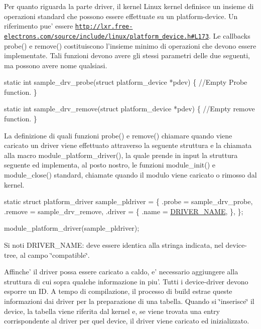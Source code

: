 Per quanto riguarda la parte driver, il kernel Linux kernel definisce un insieme di operazioni standard che possono essere effettuate su un platform-\/device. Un riferimento pue' essere \href{http://lxr.free-electrons.com/source/include/linux/platform_device.h#L173}{\tt http\+://lxr.\+free-\/electrons.\+com/source/include/linux/platform\+\_\+device.\+h\#\+L173}. Le callbacks probe() e remove() costituiscono l'insieme minimo di operazioni che devono essere implementate. Tali funzioni devono avere gli stessi parametri delle due seguenti, ma possono avere nome qualsiasi.


\begin{DoxyCode}
\textcolor{keyword}{static} \textcolor{keywordtype}{int} sample\_drv\_probe(\textcolor{keyword}{struct} platform\_device *pdev) \{
        \textcolor{comment}{//Empty Probe function.}
\}

\textcolor{keyword}{static} \textcolor{keywordtype}{int} sample\_drv\_remove(\textcolor{keyword}{struct} platform\_device *pdev) \{
        \textcolor{comment}{//Empty remove function.}
\}
\end{DoxyCode}


La definizione di quali funzioni probe() e remove() chiamare quando viene caricato un driver viene effettuato attraverso la seguente struttura e la chiamata alla macro module\+\_\+platform\+\_\+driver(), la quale prende in input la struttura seguente ed implementa, al posto nostro, le funzioni module\+\_\+init() e module\+\_\+close() standard, chiamate quando il modulo viene caricato o rimosso dal kernel.


\begin{DoxyCode}
\textcolor{keyword}{static} \textcolor{keyword}{struct }platform\_driver sample\_pldriver = \{
    .probe  = sample\_drv\_probe,
    .remove = sample\_drv\_remove,
    .driver = \{
        .name  = \hyperlink{group___linux-_driver_ga25634d21648ca7fb7a2aca614bafaaeb}{DRIVER\_NAME},
    \},
\};

module\_platform\_driver(sample\_pldriver);
\end{DoxyCode}


Si noti D\+R\+I\+V\+E\+R\+\_\+\+N\+A\+M\+E\+: deve essere identica alla stringa indicata, nel device-\/tree, al campo \char`\"{}compatible\char`\"{}.

Affinche' il driver possa essere caricato a caldo, e' necessario aggiungere alla struttura di cui sopra qualche informazione in piu'. Tutti i device-\/driver devono esporre un I\+D. A tempo di compilazione, il processo di build estrae queste informazioni dai driver per la preparazione di una tabella. Quando si \char`\"{}inserisce\char`\"{} il device, la tabella viene riferita dal kernel e, se viene trovata una entry corrispondente al driver per quel device, il driver viene caricato ed inizializzato.

